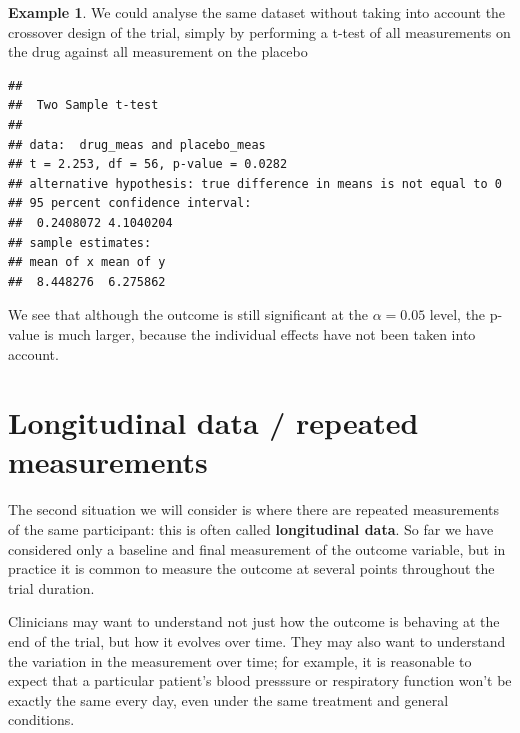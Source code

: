 \documentclass[
  openany]{book}
\newenvironment{Shaded}{\begin{snugshade}}{\end{snugshade}}
\newcommand{\AttributeTok}[1]{\textcolor[rgb]{0.13,0.29,0.53}{#1}}
\newcommand{\CommentTok}[1]{\textcolor[rgb]{0.56,0.35,0.01}{\textit{#1}}}
\newcommand{\FunctionTok}[1]{\textcolor[rgb]{0.13,0.29,0.53}{\textbf{#1}}}
\newcommand{\NormalTok}[1]{#1}
\newcommand{\OtherTok}[1]{\textcolor[rgb]{0.56,0.35,0.01}{#1}}
\newcommand{\SpecialCharTok}[1]{\textcolor[rgb]{0.81,0.36,0.00}{\textbf{#1}}}
\newcommand{\StringTok}[1]{\textcolor[rgb]{0.31,0.60,0.02}{#1}}
\theoremstyle{definition}
\theoremstyle{definition}
\newtheorem{example}{Example}[chapter]
\theoremstyle{definition}
\theoremstyle{definition}
\theoremstyle{remark}
\begin{document}
\begin{example}
We could analyse the same dataset without taking into account the crossover design of the trial, simply by performing a t-test of all measurements on the drug against all measurement on the placebo

\begin{Shaded}
\end{Shaded}

\begin{verbatim}
## 
##  Two Sample t-test
## 
## data:  drug_meas and placebo_meas
## t = 2.253, df = 56, p-value = 0.0282
## alternative hypothesis: true difference in means is not equal to 0
## 95 percent confidence interval:
##  0.2408072 4.1040204
## sample estimates:
## mean of x mean of y 
##  8.448276  6.275862
\end{verbatim}

We see that although the outcome is still significant at the \(\alpha=0.05\) level, the p-value is much larger, because the individual effects have not been taken into account.
\end{example}

\section{Longitudinal data / repeated measurements}\label{longitudinal-data-repeated-measurements}

The second situation we will consider is where there are repeated measurements of the same participant: this is often called \textbf{longitudinal data}. So far we have considered only a baseline and final measurement of the outcome variable, but in practice it is common to measure the outcome at several points throughout the trial duration.

Clinicians may want to understand not just how the outcome is behaving at the end of the trial, but how it evolves over time. They may also want to understand the variation in the measurement over time; for example, it is reasonable to expect that a particular patient's blood presssure or respiratory function won't be exactly the same every day, even under the same treatment and general conditions.
\end{document}
